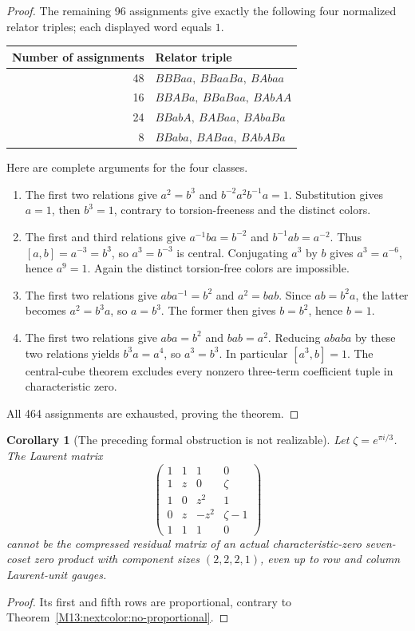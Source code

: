 \documentclass[11pt,a4paper,oneside]{report}
\newtheorem{corollary}[theorem]{Corollary}
\theoremstyle{definition}
\theoremstyle{remark}
\begin{document}
\begin{proof}
The remaining 96 assignments give exactly the following four
normalized relator triples; each displayed word equals $1$.
\begin{center}
\begin{tabular}{@{}rl@{}}
\toprule
Number of assignments & Relator triple\\
\midrule
48 & $BBBaa,\ BBaaBa,\ BAbaa$\\
16 & $BBABa,\ BBaBaa,\ BAbAA$\\
24 & $BBabA,\ BABaa,\ BAbaBa$\\
8  & $BBaba,\ BABaa,\ BAbABa$\\
\bottomrule
\end{tabular}
\end{center}
Here are complete arguments for the four classes.
\begin{enumerate}
\item The first two relations give $a^2=b^3$ and
$b^{-2}a^2b^{-1}a=1$. Substitution gives $a=1$, then $b^3=1$,
contrary to torsion-freeness and the distinct colors.
\item The first and third relations give
$a^{-1}ba=b^{-2}$ and $b^{-1}ab=a^{-2}$.
Thus $[a,b]=a^{-3}=b^3$, so $a^3=b^{-3}$ is central.
Conjugating $a^3$ by $b$ gives $a^3=a^{-6}$, hence $a^9=1$.
Again the distinct torsion-free colors are impossible.
\item The first two relations give $aba^{-1}=b^2$ and
$a^2=bab$. Since $ab=b^2a$, the latter becomes $a^2=b^3a$,
so $a=b^3$. The former then gives $b=b^2$, hence $b=1$.
\item The first two relations give $aba=b^2$ and $bab=a^2$.
Reducing $ababa$ by these two relations yields
$b^3a=a^4$, so $a^3=b^3$. In particular $[a^3,b]=1$.
The central-cube theorem excludes every nonzero three-term
coefficient tuple in characteristic zero.
\end{enumerate}
All 464 assignments are exhausted, proving the theorem.
\end{proof}

\begin{corollary}[The preceding formal obstruction is not realizable]
\label{M13:nextcolor:old-model}
Let $\zeta=e^{\pi i/3}$. The Laurent matrix
\[
 \begin{pmatrix}
 1&1&1&0\\
 1&z&0&\zeta\\
 1&0&z^2&1\\
 0&z&-z^2&\zeta-1\\
 1&1&1&0
 \end{pmatrix}
\]
cannot be the compressed residual matrix of an actual
characteristic-zero seven-coset zero product with component sizes
$(2,2,2,1)$, even up to row and column Laurent-unit gauges.
\end{corollary}
\begin{proof}
Its first and fifth rows are proportional, contrary to
Theorem~\ref{M13:nextcolor:no-proportional}.
\end{proof}
\end{document}
